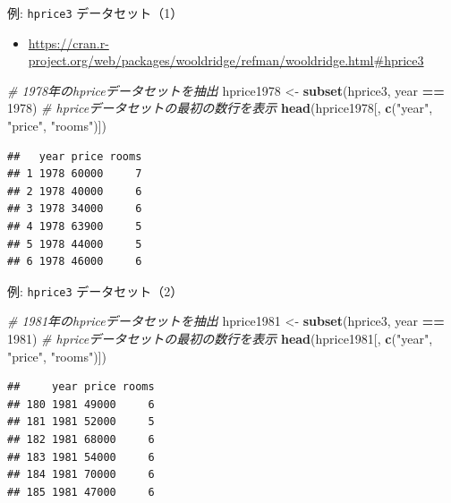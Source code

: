 \documentclass[
  ignorenonframetext,
]{beamer}
\newenvironment{Shaded}{\begin{snugshade}}{\end{snugshade}}
\newcommand{\CommentTok}[1]{\textcolor[rgb]{0.56,0.35,0.01}{\textit{#1}}}
\newcommand{\DecValTok}[1]{\textcolor[rgb]{0.00,0.00,0.81}{#1}}
\newcommand{\FunctionTok}[1]{\textcolor[rgb]{0.13,0.29,0.53}{\textbf{#1}}}
\newcommand{\NormalTok}[1]{#1}
\newcommand{\OtherTok}[1]{\textcolor[rgb]{0.56,0.35,0.01}{#1}}
\newcommand{\SpecialCharTok}[1]{\textcolor[rgb]{0.81,0.36,0.00}{\textbf{#1}}}
\newcommand{\StringTok}[1]{\textcolor[rgb]{0.31,0.60,0.02}{#1}}
\providecommand{\tightlist}{%
  \setlength{\itemsep}{0pt}\setlength{\parskip}{0pt}}
\begin{document}
\begin{frame}[fragile]{例: \texttt{hprice3} データセット（1）}
\label{ux4f8b-hprice3-ux30c7ux30fcux30bfux30bbux30c3ux30c81}
\begin{itemize}
\tightlist
\item
  \url{https://cran.r-project.org/web/packages/wooldridge/refman/wooldridge.html\#hprice3}
\end{itemize}

\begin{Shaded}
\begin{Highlighting}[]
\CommentTok{\# 1978年のhpriceデータセットを抽出}
\NormalTok{hprice1978 }\OtherTok{\textless{}{-}} \FunctionTok{subset}\NormalTok{(hprice3, year }\SpecialCharTok{==} \DecValTok{1978}\NormalTok{)}
\CommentTok{\# hpriceデータセットの最初の数行を表示}
\FunctionTok{head}\NormalTok{(hprice1978[, }\FunctionTok{c}\NormalTok{(}\StringTok{"year"}\NormalTok{, }\StringTok{"price"}\NormalTok{, }\StringTok{"rooms"}\NormalTok{)])}
\end{Highlighting}
\end{Shaded}

\begin{verbatim}
##   year price rooms
## 1 1978 60000     7
## 2 1978 40000     6
## 3 1978 34000     6
## 4 1978 63900     5
## 5 1978 44000     5
## 6 1978 46000     6
\end{verbatim}
\end{frame}

\begin{frame}[fragile]{例: \texttt{hprice3} データセット（2）}
\label{ux4f8b-hprice3-ux30c7ux30fcux30bfux30bbux30c3ux30c82}
\begin{Shaded}
\begin{Highlighting}[]
\CommentTok{\# 1981年のhpriceデータセットを抽出}
\NormalTok{hprice1981 }\OtherTok{\textless{}{-}} \FunctionTok{subset}\NormalTok{(hprice3, year }\SpecialCharTok{==} \DecValTok{1981}\NormalTok{)}
\CommentTok{\# hpriceデータセットの最初の数行を表示}
\FunctionTok{head}\NormalTok{(hprice1981[, }\FunctionTok{c}\NormalTok{(}\StringTok{"year"}\NormalTok{, }\StringTok{"price"}\NormalTok{, }\StringTok{"rooms"}\NormalTok{)])}
\end{Highlighting}
\end{Shaded}

\begin{verbatim}
##     year price rooms
## 180 1981 49000     6
## 181 1981 52000     5
## 182 1981 68000     6
## 183 1981 54000     6
## 184 1981 70000     6
## 185 1981 47000     6
\end{verbatim}
\end{frame}
\end{document}
